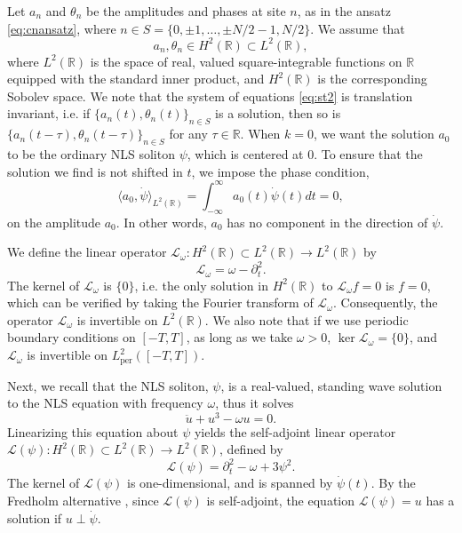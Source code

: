 \documentclass[11pt,reqno]{amsart}
\def\R{{\mathbb R}}
\def\calL{{\mathcal L}}
\def\Lw{{\mathcal{L}_\omega}}
\begin{document}
Let $a_n$ and $\theta_n$ be the amplitudes and phases at site $n$, as in the ansatz \cref{eq:cnansatz}, where $n \in S = \{ 0, \pm 1, \dots, \pm N/2-1, N/2 \}$. We assume that 
\[
a_n, \theta_n \in H^2(\R) \subset L^2(\R),
\]
where $L^2(\R)$ is the space of real, valued square-integrable functions on $\R$ equipped with the standard inner product, and $H^2(\R)$ is the corresponding Sobolev space. We note that the system of equations \cref{eq:st2} is translation invariant, i.e. if $\{ a_n(t), \theta_n(t)\}_{n\in S}$ is a solution, then so is $\{ a_n(t-\tau), \theta_n(t-\tau)\}_{n\in S}$ for any $\tau \in \R$. When $k = 0$, we want the solution $a_0$ to be the ordinary NLS soliton $\psi$, which is centered at 0. To ensure that the solution we find is not shifted in $t$, we impose the phase condition,
\begin{equation}\label{eq:phasecond}
\langle a_0, \dot{\psi} \rangle_{L^2(\R)} = \int_{-\infty}^\infty a_0(t) \dot{\psi}(t) dt = 0,
\end{equation}
on the amplitude $a_0$. In other words, $a_0$ has no component in the direction of $\dot{\psi}$.

We define the linear operator $\Lw: H^2(\R) \subset L^2(\R) \rightarrow L^2(\R)$ by
\begin{equation}\label{eq:Lw}
\Lw = \omega - \partial_t^2.
\end{equation}
The kernel of $\Lw$ is $\{0\}$, i.e. the only solution in $H^2(\R)$ to $\Lw f = 0$ is $f = 0$, which can be verified by taking the Fourier transform of $\Lw$. Consequently, the operator $\Lw$ is invertible on $L^2(\R)$. We also note that if we use periodic boundary conditions on $[-T,T]$, as long as we take $\omega > 0$, $\ker \Lw = \{0\}$, and $\Lw$ is invertible on $L^2_{\text{per}}([-T,T])$.

Next, we recall that the NLS soliton, $\psi$, is a real-valued, standing wave solution to the NLS equation with frequency $\omega$, thus it solves 
\begin{equation}\label{eq:NLSreal}
\ddot{u} + u^3 - \omega u = 0. 
\end{equation}
Linearizing this equation about $\psi$ yields the self-adjoint linear operator $\calL(\psi): H^2(\R) \subset L^2(\R) \rightarrow L^2(\R)$, defined by
\begin{equation}\label{eq:Lpsi}
\calL(\psi) = \partial_t^2 - \omega + 3 \psi^2.
\end{equation}
The kernel of $\calL(\psi)$ is one-dimensional, and is spanned by $\dot{\psi}(t)$. By the Fredholm alternative \cite{Ramm2001}, since $\calL(\psi)$ is self-adjoint, the equation $\calL(\psi) = u$ has a solution if $u \perp \dot{\psi}$.
\end{document}
